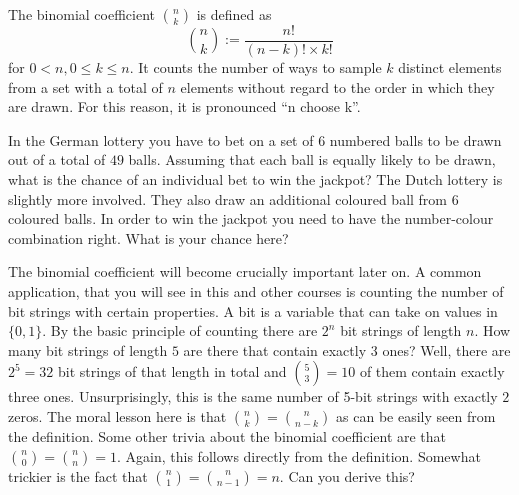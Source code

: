 \begin{Definition}
The binomial coefficient $ \binom{n}{k} $ is defined as 
$$ \binom{n}{k} := \dfrac{n!}{(n-k)!\times k!} $$ 
for $ 0 < n, 0 \leq k \leq n $. It counts the number of ways
to sample $ k $ distinct elements from a set with a total of $ n $ elements without regard to the order in which they are drawn.
For this reason, it is pronounced ``n choose k''.
\end{Definition}

\begin{Exercise}
In the German lottery you have to bet on a set of $ 6 $ numbered balls to be drawn out of a total of $ 49 $ balls. Assuming that
each ball is equally likely to be drawn, what is the chance of an individual bet to win the jackpot? The Dutch lottery is 
slightly more involved. They also draw an additional coloured ball from $ 6 $ coloured balls. In order to win the jackpot you need to have 
the number-colour combination right. What is your chance here?
\end{Exercise}

The binomial coefficient will become crucially important later on. A common application, that you will see in this and other courses
is counting the number of bit strings with certain properties. A bit is a variable that can take on values in $ \{0,1\} $. By the 
basic principle of counting there are $ 2^{n} $ bit strings of length $ n $. How many bit strings of length $ 5 $ are there that contain
exactly $ 3 $ ones? Well, there are $ 2^{5} = 32 $ bit strings of that length in total and $ \binom{5}{3} = 10 $ of them contain exactly
three ones. Unsurprisingly, this is the same number of 5-bit strings with exactly $ 2 $ zeros. 
The moral lesson here is that $ \binom{n}{k} = \binom{n}{n-k} $ as can be easily seen from the definition. Some other trivia about the
binomial coefficient are that $ \binom{n}{0} = \binom{n}{n} = 1 $. Again, this follows directly from the definition. Somewhat trickier
is the fact that $ \binom{n}{1} = \binom{n}{n-1} = n $. Can you derive this?

